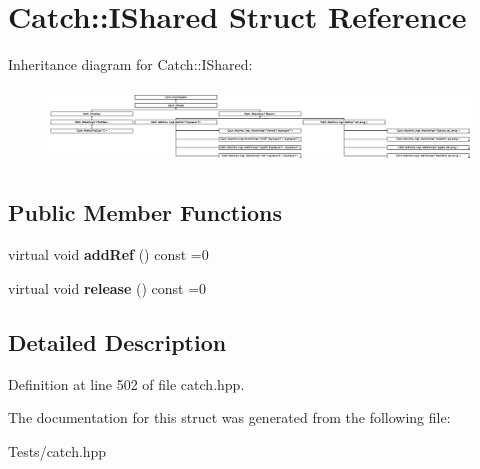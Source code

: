 \hypertarget{struct_catch_1_1_i_shared}{}\section{Catch\+:\+:I\+Shared Struct Reference}
\label{struct_catch_1_1_i_shared}
Inheritance diagram for Catch\+:\+:I\+Shared\+:\begin{figure}[H]
\begin{center}
\leavevmode
\includegraphics[height=2.004474cm]{struct_catch_1_1_i_shared}
\end{center}
\end{figure}
\subsection*{Public Member Functions}
\begin{DoxyCompactItemize}
\item 
\mbox{\label{struct_catch_1_1_i_shared_ae383df68557cdaf0910b411af04d9e33}} 
virtual void {\bfseries add\+Ref} () const =0
\item 
\mbox{\label{struct_catch_1_1_i_shared_a002f52624728a763956fb6f230cb2f57}} 
virtual void {\bfseries release} () const =0
\end{DoxyCompactItemize}


\subsection{Detailed Description}


Definition at line 502 of file catch.\+hpp.



The documentation for this struct was generated from the following file\+:\begin{DoxyCompactItemize}
\item 
Tests/catch.\+hpp\end{DoxyCompactItemize}
